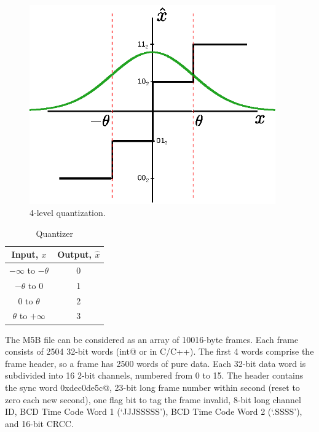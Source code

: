 \documentclass[letterpaper,twoside,12pt]{article}
\begin{document}
\begin{figure}[ht!]
  \begin{center}
  \includegraphics[width=25pc]{fig_4_Level_Quantization_Pattern_impr.eps}
  \caption{\small 4-level quantization.}
  \label{quant4lvl}
  \end{center}
\end{figure}


\begin{table}[ht!]
  \begin{center}
    \caption{Quantizer}
    \label{quant_io}
    \begin{tabular}{c|c}
      \textbf{Input, $x$} & \textbf{Output, $\hat{x}$} \\
      \hline
      $-\infty$ to $-\theta$ & 0 \\
      $-\theta$ to 0         & 1 \\
      0 to $\theta$          & 2 \\
      $\theta$ to $+\infty$  & 3 \\
    \end{tabular}
  \end{center}
\end{table}


The M5B file can be considered as an array of 10016-byte frames. Each frame consists of 2504 32-bit words (\verb@unsigned int@ or  \verb@uint@ in C/C++). The first 4 words comprise the frame header, so a frame has 2500 words of pure data. Each 32-bit data word is subdivided into 16 2-bit channels, numbered from 0 to 15. The header contains the sync word \verb@0xdec0de5c@, 23-bit long frame number within second (reset to zero each new second), one flag bit to tag the frame invalid, 8-bit long channel ID, BCD Time Code Word 1 (‘JJJSSSSS’), BCD Time Code Word 2 (‘.SSSS’), and  16-bit CRCC.
\end{document}
